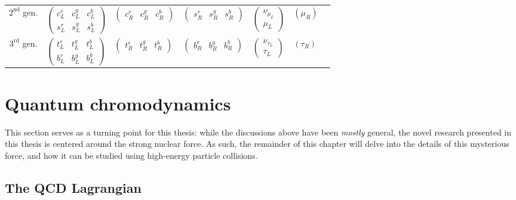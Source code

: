 \begin{table}
{\begin{tabular}{c|llllll}
$2^{\text{nd}}$ gen. & $\left(\begin{array}{lllll}c_L^r & c_L^g & c_L^b \\
s_L^r & s_L^g & s_L^b\end{array}\right)$ & $\left(\begin{array}{llll}c_R^r & c_R^g & c_R^b\end{array}\right)$ & $\left(\begin{array}{llll}s_R^r & s_R^g & s_R^b\end{array}\right)$ & $\left(\begin{array}{c}\nu_{\mu_L} \\
\mu_L\end{array}\right)$ & $\left(\mu_R\right)$ \\
$3^{\text{rd}}$ gen. & $\left(\begin{array}{llll}t_L^r & t_L^g & t_L^b \\
b_L^r & b_L^g & b_L^b\end{array}\right)$ & $\left(\begin{array}{llll}t_R^r & t_R^g & t_R^b\end{array}\right)$ & $\left(\begin{array}{lll}b_R^r & b_R^g & b_R^b\end{array}\right)$ & $\left(\begin{array}{c}\nu_{\tau_L} \\
\tau_L\end{array}\right)$ & $\left(\tau_R\right)$

\end{tabular}}
\end{table}


\section{Quantum chromodynamics}
\label{sec:qcd}


This section serves as a turning point for this thesis: while the discussions above have been \textit{mostly} general, the novel research presented in this thesis is centered around the strong nuclear force. As such, the remainder of this chapter will delve into the details of this mysterious force, and how it can be studied using high-energy particle collisions. 


\subsection{The QCD Lagrangian}
\label{sec:qcd_lagrangian}

